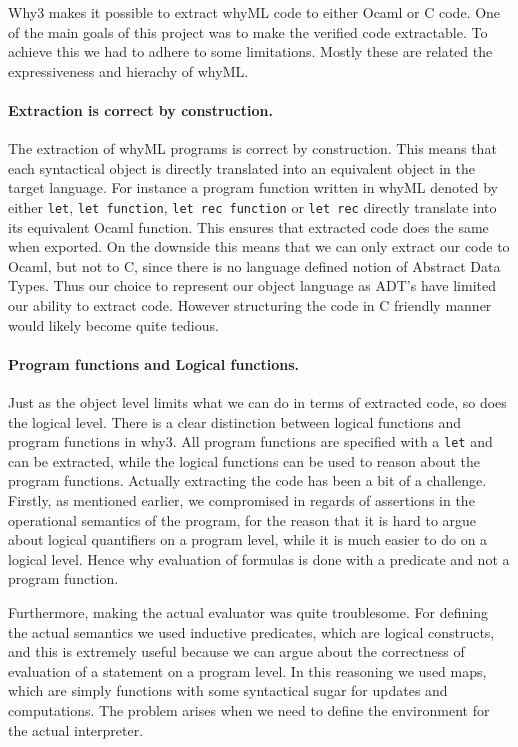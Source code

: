 Why3 makes it possible to extract whyML code to either Ocaml or C code.
One of the main goals of this project was to make the verified code extractable.
To achieve this we had to adhere to some limitations.
Mostly these are related the expressiveness and hierachy of whyML.

\paragraph{Extraction is correct by construction.}
The extraction of whyML programs is correct by construction.
This means that each syntactical object is directly translated into an equivalent object
in the target language. For instance a program function written in whyML denoted by either \texttt{let}, \texttt{let function}, \texttt{let rec function} or \texttt{let rec} directly translate into its equivalent Ocaml function. This ensures that extracted code does the same when exported.
On the downside this means that we can only extract our code to Ocaml, but not to C, since there is no
language defined notion of Abstract Data Types.
Thus our choice to represent our object language as ADT's have limited our ability to extract code.
However structuring the code in C friendly manner would likely become quite tedious.

\paragraph{Program functions and Logical functions.}
Just as the object level limits what we can do in terms of extracted code, so does the logical level.
There is a clear distinction between logical functions and program functions in why3.
All program functions are specified with a \texttt{let} and can be extracted,
while the logical functions can be used to reason about the program functions.
Actually extracting the code has been a bit of a challenge.
Firstly, as mentioned earlier, we compromised in regards of assertions in the operational semantics of the program,
for the reason that it is hard to argue about logical quantifiers on a program level,
while it is much easier to do on a logical level.
Hence why evaluation of formulas is done with a predicate and not a program function.

Furthermore, making the actual evaluator was quite troublesome.
For defining the actual semantics we used inductive predicates, which are logical constructs, and this is extremely useful because we can argue about the correctness of evaluation of a statement on a program level.
In this reasoning we used maps, which are simply functions with some syntactical sugar for updates and computations.
The problem arises when we need to define the environment for the actual interpreter.

